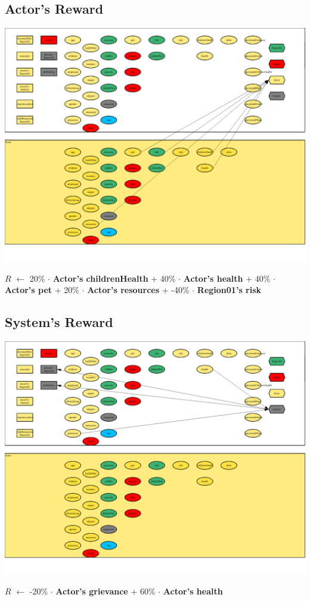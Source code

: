 \documentclass{article}%
\begin{document}
\subsection{Actor's Reward}%
\label{subsec:Actor's Reward}%
\includegraphics[width=\textwidth]{images/Actor.png}%
\begin{flushleft}%
$R$%
$\leftarrow$%
20\%%
$\cdot$%
\textbf{Actor's childrenHealth}%
+%
40\%%
$\cdot$%
\textbf{Actor's health}%
+%
40\%%
$\cdot$%
\textbf{Actor's pet}%
+%
20\%%
$\cdot$%
\textbf{Actor's resources}%
+%
{-}40\%%
$\cdot$%
\textbf{Region01's risk}%
\end{flushleft}

%
\subsection{System's Reward}%
\label{subsec:System's Reward}%
\includegraphics[width=\textwidth]{images/System.png}%
\begin{flushleft}%
$R$%
$\leftarrow$%
{-}20\%%
$\cdot$%
\textbf{Actor's grievance}%
+%
60\%%
$\cdot$%
\textbf{Actor's health}%
\end{flushleft}

%
\end{document}
